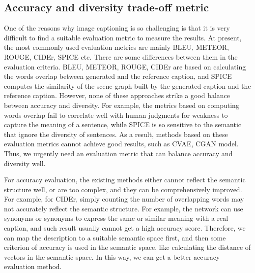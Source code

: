 \documentclass[12pt]{article}
\begin{document}
	\subsection{Accuracy and diversity trade-off metric}
	One of the reasons why image captioning is so challenging is that it is very difficult to find a suitable evaluation metric to measure the results. At present, the most commonly used evaluation metrics are mainly BLEU, METEOR, ROUGE, CIDEr, SPICE etc. There are some differences between them in the evaluation criteria. BLEU, METEOR, ROUGE, CIDEr are based on calculating the words overlap between generated and the reference caption, and SPICE computes the similarity of the scene graph built by the generated caption and the reference caption. However, none of these approaches strike a good balance between accuracy and diversity. For example, the metrics based on computing words overlap fail to correlate well with human judgments for weakness to capture the meaning of a sentence, while SPICE is so sensitive to the semantic that ignore the diversity of sentences. As a result, methods based on these evaluation metrics cannot achieve good results, such as CVAE, CGAN model. Thus, we urgently need an evaluation metric that can balance accuracy and diversity well. \par
	For accuracy evaluation, the existing methods either cannot reflect the semantic structure well, or are too complex, and they can be comprehensively improved. For example, for CIDEr, simply counting the number of overlapping words may not accurately reflect the semantic structure. For example, the network can use synonyms or synonyms to express the same or similar meaning with a real caption, and such result usually cannot get a high accuracy score. Therefore, we can map the description to a suitable semantic space first, and then some criterion of accuracy is used in the semantic space, like calculating the distance of vectors in the semantic space. In this way, we can get a better accuracy evaluation method.  \par
\end{document}
